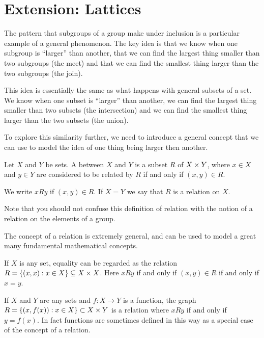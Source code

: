 \section{Extension: Lattices}

The pattern that subgroups of a group make under inclusion is a particular
example of a general phenomenon.  The key idea is that we know when one
subgroup is ``larger'' than another, that we can find the largest thing
smaller than two subgroups (the meet) and that we can find the smallest thing 
larger than the two subgroups (the join).

This idea is essentially the same as what happens with general subsets of a set.
We know when one subset is ``larger'' than another, we can find the
largest thing smaller than two subsets (the intersection) and we can find the
smallest thing larger than the two subsets (the union).

To explore this similarity further, we need to introduce a general concept that
we can use to model the idea of one thing being larger then another.

\begin{definition}
  Let $X$ and $Y$ be sets.  A  between $X$ and $Y$
  is a subset $R$ of $X \times Y$, where $x \in X$ and $y \in Y$ are
  considered to be related by $R$ if and only if $(x,y) \in R$.
  
  We write $xRy$ if $(x,y) \in R$.  If $X = Y$ we say that $R$ is a relation
  on $X$.
\end{definition}

Note that you should not confuse this definition of relation with the notion
of a relation on the elements of a group.

The concept of a relation is extremely general, and can be used to model a
great many fundamental mathematical concepts.

\begin{example}
  If $X$ is any set, equality can be regarded as the relation $R = \{(x,x) : x
  \in X\} \subseteq X \times X$.  Here $xRy$ if and only if $(x,y) \in R$ if and
  only if $x = y$.
\end{example}

\begin{example}
  If $X$ and $Y$ are any sets and $f : X \to Y$ is a function, the graph
  $R = \{(x, f(x)): x \in X\} \subset X \times Y$ is a relation where $xRy$ if and only if
  $y = f(x)$.  In fact functions are sometimes defined in this way as a
  special case of the concept of a relation.
\end{example}

